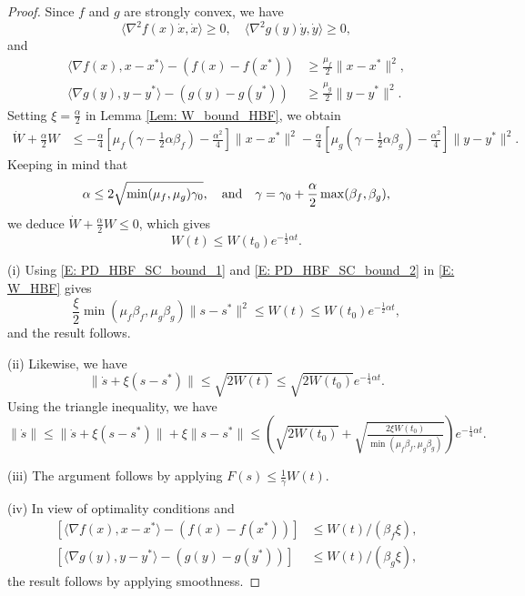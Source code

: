 \documentclass[pdflatex,sn-mathphys-num]{sn-jnl}
\theoremstyle{thmstyleone}
\theoremstyle{thmstyletwo}
\theoremstyle{thmstylethree}
\newcommand{\qbox}[1]{\quad\hbox{#1}\quad}
\begin{document}
\begin{proof}
Since $f$ and $g$ are strongly convex, we have
$$\langle \nabla^2 f(x)\dot{x}, \dot{x} \rangle \ge 0, \quad \langle \nabla^2 g(y)\dot{y}, \dot{y} \rangle\ge 0, $$
and
\begin{align}
\label{E: PD_HBF_SC_bound_1}
\langle \nabla f(x), x-x^* \rangle - \left( f(x) - f(x^*) \right) 
&\ge \frac{\mu_f}{2}\| x-x^* \|^2,\\
\label{E: PD_HBF_SC_bound_2}
\langle \nabla g(y), y-y^* \rangle - \left( g(y) - g(y^*) \right) 
&\ge \frac{\mu_g}{2}\| y-y^* \|^2.
\end{align}
Setting $\xi = \frac{\alpha}{2}$ in Lemma \ref{Lem: W_bound_HBF}, we obtain
\begin{align*}
\dot{W} + \frac{\alpha}{2}W 
&\le -\tfrac{\alpha}{4}\left[ \mu_f\left( \gamma - \tfrac{1}{2}\alpha\beta_f \right) - \tfrac{\alpha^2}{4} \right] \| x-x^* \|^2 
 -\tfrac{\alpha}{4}\left[ \mu_g\left( \gamma - \tfrac{1}{2}\alpha\beta_g \right) - \tfrac{\alpha^2}{4} \right] \| y-y^* \|^2.
\end{align*}
Keeping in mind that
$$ \alpha\le 2\sqrt{ \min(\mu_f,\mu_g) \gamma_0 },\qbox{and} \gamma = \gamma_0 + \frac{\alpha}{2} \max(\beta_f,\beta_g), $$
we deduce $\dot{W} + \frac{\alpha}{2}W \le 0$, which gives 
$$ W(t) \le W(t_0) e^{-\frac{1}{2}\alpha t}. $$

(i) Using \eqref{E: PD_HBF_SC_bound_1} and \eqref{E: PD_HBF_SC_bound_2} in \eqref{E: W_HBF} gives
$$ \frac{\xi}{2}\min(\mu_f\beta_f,\mu_g\beta_g) \| s-s^* \|^2 \le W(t) \le W(t_0) e^{-\frac{1}{2}\alpha t}, $$
and the result follows.

(ii) Likewise, we have 
$$ \| \dot{s} + \xi(s-s^*) \| \le \sqrt{2W(t)} \le \sqrt{2W(t_0)} e^{-\frac{1}{4}\alpha t }. $$
Using the triangle inequality, we have
$$ \| \dot{s} \| \le \| \dot{s} + \xi(s-s^*) \| + \xi \| s-s^* \| \le \left( \sqrt{ 2W(t_0)} + \sqrt{\tfrac{2\xi W(t_0)}{\min(\mu_f\beta_f,\mu_g\beta_g)} } \right) e^{-\frac{1}{4}\alpha t } . $$

(iii) The argument follows by applying $ F(s) \le \frac{1}{\gamma}W(t) $.

(iv) In view of optimality conditions and
\begin{align*}
\left[ \langle \nabla f(x), x-x^* \rangle - \left( f(x) - f(x^*) \right) \right] 
&\le W(t)/(\beta_f\xi),\\
\left[ \langle \nabla g(y), y-y^* \rangle - \left( g(y) - g(y^*) \right) \right]
&\le W(t)/(\beta_g\xi),
\end{align*}
the result follows by applying smoothness.
\end{proof}
\end{document}
